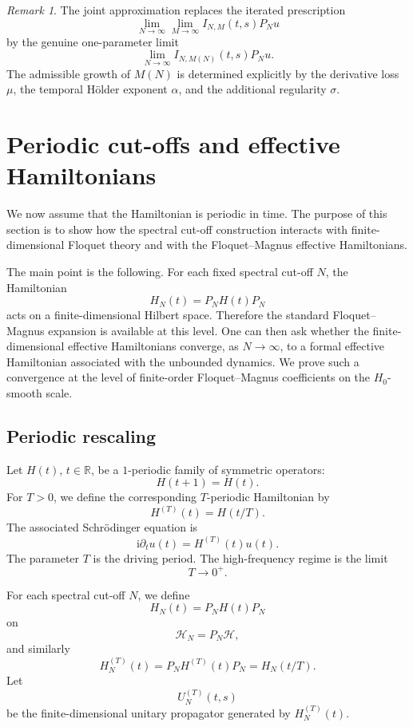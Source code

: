 \documentclass[11pt]{amsart}
\theoremstyle{plain}
\theoremstyle{definition}
\theoremstyle{remark}
\newtheorem{remark}[theorem]{Remark}
\newcommand{\Hilb}{\mathcal H}
\newcommand{\ii}{\mathrm i}
\begin{document}
\begin{remark}
The joint approximation replaces the iterated prescription
\[
 \lim_{N\to\infty}\lim_{M\to\infty}
 I_{N,M}(t,s)P_Nu
\]
by the genuine one-parameter limit
\[
 \lim_{N\to\infty}I_{N,M(N)}(t,s)P_Nu.
\]
The admissible growth of \(M(N)\) is determined explicitly by the derivative
loss \(\mu\), the temporal Hölder exponent \(\alpha\), and the additional
regularity \(\sigma\).
\end{remark}


\section{Periodic cut-offs and effective Hamiltonians}
\label{sec:periodic-effective-hamiltonians}

We now assume that the Hamiltonian is periodic in time.  The purpose of
this section is to show how the spectral cut-off construction interacts
with finite-dimensional Floquet theory and with the Floquet--Magnus
effective Hamiltonians.

The main point is the following.  For each fixed spectral cut-off \(N\),
the Hamiltonian
\[
        H_N(t)=P_NH(t)P_N
\]
acts on a finite-dimensional Hilbert space.  Therefore the standard
Floquet--Magnus expansion is available at this level.  One can then ask
whether the finite-dimensional effective Hamiltonians converge, as
\(N\to\infty\), to a formal effective Hamiltonian associated with the
unbounded dynamics.  We prove such a convergence at the level of
finite-order Floquet--Magnus coefficients on the \(H_0\)-smooth scale.

\subsection{Periodic rescaling}

Let \(H(t)\), \(t\in\mathbb R\), be a \(1\)-periodic family of symmetric
operators:
\[
        H(t+1)=H(t).
\]
For \(T>0\), we define the corresponding \(T\)-periodic Hamiltonian by
\[
        H^{(T)}(t)=H(t/T).
\]
The associated Schr\"odinger equation is
\[
        \ii \partial_t u(t)=H^{(T)}(t)u(t).
\]
The parameter \(T\) is the driving period.  The high-frequency regime is
the limit
\[
        T\to0^+.
\]

For each spectral cut-off \(N\), we define
\[
        H_N(t)=P_NH(t)P_N
\]
on
\[
        \Hilb_N=P_N\Hilb,
\]
and similarly
\[
        H_N^{(T)}(t)=P_NH^{(T)}(t)P_N
        =
        H_N(t/T).
\]
Let
\[
        U_N^{(T)}(t,s)
\]
be the finite-dimensional unitary propagator generated by
\(H_N^{(T)}(t)\).
\end{document}

